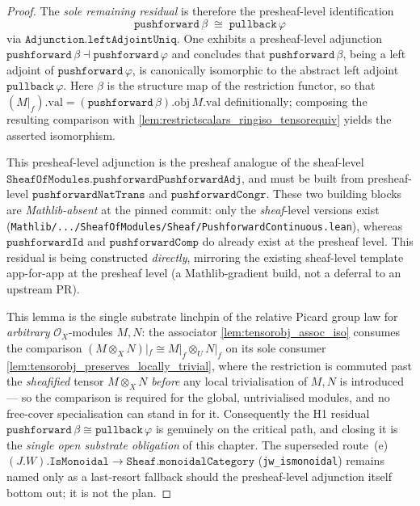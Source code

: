 \begin{proof}
  The \emph{sole remaining residual} is therefore the presheaf-level identification
  \[
    \mathtt{pushforward}\,\beta \;\cong\; \mathtt{pullback}\,\varphi
  \]
  via \(\mathtt{Adjunction.leftAdjointUniq}\). One exhibits a
  presheaf-level adjunction
  \(\mathtt{pushforward}\,\beta \dashv \mathtt{pushforward}\,\varphi\) and concludes
  that \(\mathtt{pushforward}\,\beta\), being a left adjoint of
  \(\mathtt{pushforward}\,\varphi\), is canonically isomorphic to the abstract left
  adjoint \(\mathtt{pullback}\,\varphi\). Here \(\beta\) is the structure map of the
  restriction functor, so that \((M|_f).\mathrm{val} =
  (\mathtt{pushforward}\,\beta).\mathrm{obj}\,M.\mathrm{val}\) definitionally;
  composing the resulting comparison with
  \cref{lem:restrictscalars_ringiso_tensorequiv} yields the asserted isomorphism.

  This presheaf-level adjunction is the presheaf analogue of the sheaf-level
  \(\mathtt{SheafOfModules.pushforwardPushforwardAdj}\), and must be built from
  presheaf-level \(\mathtt{pushforwardNatTrans}\) and
  \(\mathtt{pushforwardCongr}\). These two building blocks are \emph{Mathlib-absent}
  at the pinned commit: only the \emph{sheaf}-level versions exist
  (\texttt{Mathlib/.../SheafOfModules/Sheaf/PushforwardContinuous.lean}), whereas
  \(\mathtt{pushforwardId}\) and \(\mathtt{pushforwardComp}\) do already exist at the
  presheaf level. This residual is being constructed \emph{directly}, mirroring the
  existing sheaf-level template app-for-app at the presheaf level (a Mathlib-gradient
  build, not a deferral to an upstream PR).

  This lemma is the single substrate linchpin of the relative Picard group law for
  \emph{arbitrary} \(\mathcal{O}_X\)-modules \(M, N\): the associator
  \cref{lem:tensorobj_assoc_iso} consumes the comparison
  \((M \otimes_X N)|_f \cong M|_f \otimes_U N|_f\) on its sole consumer
  \cref{lem:tensorobj_preserves_locally_trivial}, where the restriction is commuted
  past the \emph{sheafified} tensor \(M \otimes_X N\) \emph{before} any local
  trivialisation of \(M, N\) is introduced --- so the comparison is required for the
  global, untrivialised modules, and no free-cover specialisation can stand in for it.
  Consequently the H1 residual \(\mathtt{pushforward}\,\beta \cong
  \mathtt{pullback}\,\varphi\) is genuinely on the critical path, and closing it is
  the \emph{single open substrate obligation} of this chapter. The superseded
  route~(e) \((J.W).\mathtt{IsMonoidal} \to \mathtt{Sheaf.monoidalCategory}\)
  (\texttt{jw\_ismonoidal}) remains named only as a last-resort fallback should the
  presheaf-level adjunction itself bottom out; it is not the plan.
\end{proof}

